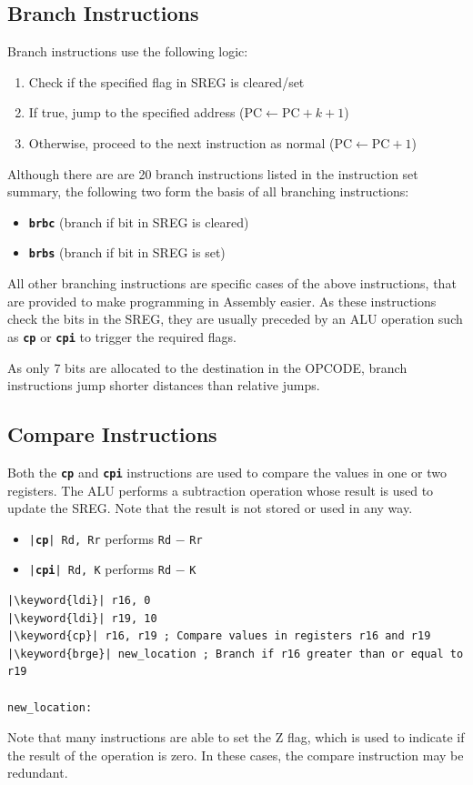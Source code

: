 \documentclass{report}
\newcommand{\keyword}[1]{\textcolor[rgb]{0.00,0.50,0.00}{\textbf{#1}}}
\newcommand{\keywordinline}[1]{\textcolor[rgb]{0.00,0.50,0.00}{\textbf{\texttt{#1}}}}
\begin{document}
\subsection{Branch Instructions}
Branch instructions use the following logic:
\begin{enumerate}
    \item Check if the specified flag in SREG is cleared/set
    \item If true, jump to the specified address (\(\mathrm{PC} \leftarrow \mathrm{PC} + k + 1\))
    \item Otherwise, proceed to the next instruction as normal (\(\mathrm{PC} \leftarrow \mathrm{PC} + 1\))
\end{enumerate}
Although there are are 20 branch instructions listed in the instruction set summary, the following two form the basis of all branching instructions:
\begin{itemize}
    \item \keywordinline{brbc} (branch if bit in SREG is cleared)
    \item \keywordinline{brbs} (branch if bit in SREG is set)
\end{itemize}
All other branching instructions are specific cases of the above instructions, that are provided to make programming in Assembly easier.
As these instructions check the bits in the SREG, they are usually preceded by an ALU operation such as \keywordinline{cp} or \keywordinline{cpi} to trigger the required flags.

As only 7 bits are allocated to the destination in the OPCODE, branch instructions jump shorter distances than relative jumps.
\subsection{Compare Instructions}
Both the \keywordinline{cp} and \keywordinline{cpi} instructions are used to compare the values in one or two registers.
The ALU performs a subtraction operation whose result is used to update the SREG\@. Note that the result is not stored or used in any way.
\begin{itemize}
    \item \texttt{|\keyword{cp}| Rd, Rr} performs \texttt{Rd} \(-\) \texttt{Rr}
    \item \texttt{|\keyword{cpi}| Rd, K} performs \texttt{Rd} \(-\) \texttt{K}
\end{itemize}
\begin{verbatim}
|\keyword{ldi}| r16, 0
|\keyword{ldi}| r19, 10
|\keyword{cp}| r16, r19 ; Compare values in registers r16 and r19
|\keyword{brge}| new_location ; Branch if r16 greater than or equal to r19

new_location:
\end{verbatim}
Note that many instructions are able to set the Z flag, which is used to indicate if the result of the operation is zero.
In these cases, the compare instruction may be redundant.
\end{document}
